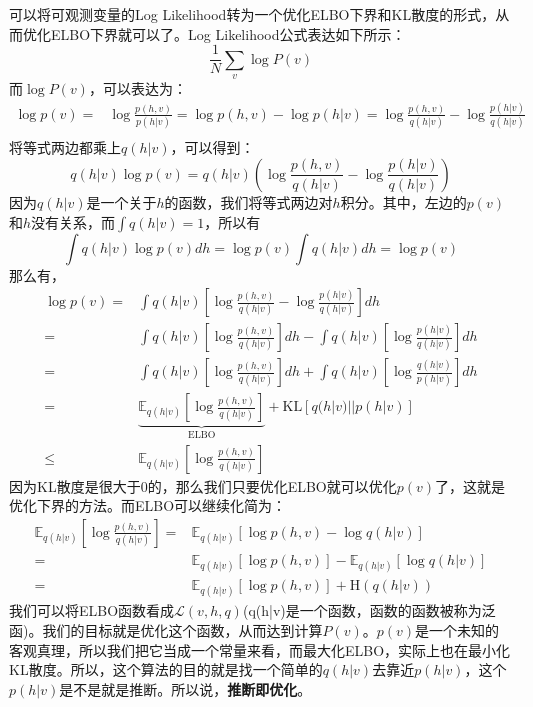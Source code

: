 \documentclass[a4paper]{article}
\begin{document}
可以将可观测变量的Log Likelihood转为一个优化ELBO下界和KL散度的形式，从而优化ELBO下界就可以了。Log Likelihood公式表达如下所示：
\begin{equation}
    \frac{1}{N} \sum_{v} \log P(v)
\end{equation}
而$\log P(v)$，可以表达为：
\begin{equation}
    \begin{split}
        \log p(v) = & \log \frac{p(h,v)}{p(h|v)}
        = \log p(h,v) - \log p(h|v) 
        = \log\frac{p(h,v)}{q(h|v)} - \log \frac{p(h|v)}{q(h|v)} \\
    \end{split}
\end{equation}
将等式两边都乘上$q(h|v)$，可以得到：
\begin{equation}
    q(h|v) \log p(v) = q(h|v) \left( \log\frac{p(h,v)}{q(h|v)} - \log \frac{p(h|v)}{q(h|v)} \right)
\end{equation}
因为$q(h|v)$是一个关于$h$的函数，我们将等式两边对$h$积分。其中，左边的$p(v)$和$h$没有关系，而$\int q(h|v) =1$，所以有
$$\int q(h|v) \log p(v) dh = \log p(v) \int q(h|v)  dh = \log p(v) $$
那么有，
\begin{equation}
\begin{split}
    \log p(v) = & \int q(h|v) \left[ \log\frac{p(h,v)}{q(h|v)} - \log \frac{p(h|v)}{q(h|v)} \right]dh \\
    = & \int q(h|v) \left[ \log\frac{p(h,v)}{q(h|v)} \right]dh - \int q(h|v) \left[ \log \frac{p(h|v)}{q(h|v)} \right]dh \\
    = & \int q(h|v) \left[ \log\frac{p(h,v)}{q(h|v)} \right]dh + \int q(h|v) \left[ \log \frac{q(h|v)}{p(h|v)} \right]dh \\
    = & \underbrace{\mathbb{E}_{q(h|v)} \left[ \log\frac{p(h,v)}{q(h|v)} \right]}_{\mathrm{ELBO}} + \mathrm{KL}[q(h|v)||p(h|v)] \\
    \leq & \mathbb{E}_{q(h|v)} \left[ \log\frac{p(h,v)}{q(h|v)}\right]
\end{split}
\end{equation}
因为KL散度是很大于0的，那么我们只要优化ELBO就可以优化$p(v)$了，这就是优化下界的方法。而ELBO可以继续化简为：
\begin{equation}
    \begin{split}
        \mathbb{E}_{q(h|v)} \left[ \log\frac{p(h,v)}{q(h|v)}\right] = & \mathbb{E}_{q(h|v)} \left[ \log p(h,v) - \log q(h|v)\right] \\
        = & \mathbb{E}_{q(h|v)} \left[ \log p(h,v) \right] -\mathbb{E}_{q(h|v)} [ \log q(h|v) ] \\
        = & \mathbb{E}_{q(h|v)} \left[ \log p(h,v) \right] + \mathrm{H}(q(h|v))
    \end{split}
\end{equation}
我们可以将ELBO函数看成$\mathcal{L}(v,h,q)$(q(h|v)是一个函数，函数的函数被称为泛函)。我们的目标就是优化这个函数，从而达到计算$P(v)$。$p(v)$是一个未知的客观真理，所以我们把它当成一个常量来看，而最大化ELBO，实际上也在最小化KL散度。所以，这个算法的目的就是找一个简单的$q(h|v)$去靠近$p(h|v)$，这个$p(h|v)$是不是就是推断。所以说，\textbf{推断即优化}。
\end{document}
